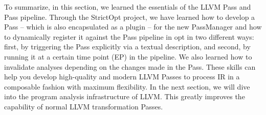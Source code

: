 \begin{enumerate}
To summarize, in this section, we learned the essentials of the LLVM Pass and Pass pipeline. Through the StrictOpt project, we have learned how to develop a Pass – which is also encapsulated as a plugin – for the new PassManager and how to dynamically register it against the Pass pipeline in opt in two different ways: first, by triggering the Pass explicitly via a textual description, and second, by running it at a certain time point (EP) in the pipeline. We also learned how to invalidate analyses depending on the changes made in the Pass. These skills can help you develop high-quality and modern LLVM Passes to process IR in a composable fashion with maximum flexibility. In the next section, we will dive into the program analysis infrastructure of LLVM. This greatly improves the capability of normal LLVM transformation Passes.

\end{enumerate}































